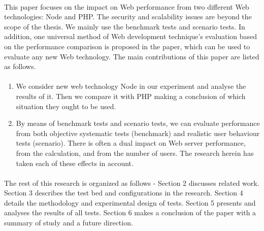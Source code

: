 \documentclass[thesis.tex]{subfiles}
\begin{document}
\paragraph{}
This paper focuses on the impact on Web performance from two different Web technologies: Node and PHP. The security and scalability issues are beyond the scope of the thesis. We mainly use the benchmark tests and scenario tests. In addition, one universal method of Web development technique’s evaluation based on the performance comparison is proposed in the paper, which can be used to evaluate any new Web technology. The main contributions of this paper are listed as follows. 
\paragraph{}
\begin{enumerate}
    \item We consider new web technology Node in our experiment and analyse the results of it. Then we compare it with PHP making a conclusion of which situation they ought to be used. 
    \item By means of benchmark tests and scenario tests, we can evaluate performance from both objective systematic tests (benchmark) and realistic user behaviour tests (scenario). There is often a dual impact on Web server performance, from the calculation, and from the number of users. The research herein has taken each of these effects in account.
\end{enumerate} 
\paragraph{}

The rest of this research is organized as follows - Section 2 discusses related work. Section 3 describes the test bed and configurations in the research. Section 4 details the methodology and experimental design of tests. Section 5 presents and analyses the results of all tests. Section 6 makes a conclusion of the paper with a summary of study and a future direction.
\end{document}
